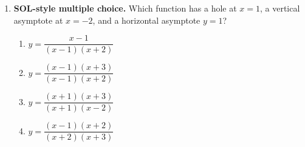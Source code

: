 \documentclass[10pt]{article}
\begin{document}
\begin{enumerate}[leftmargin=1.8em, itemsep=8pt]
  \item \textbf{SOL-style multiple choice.} Which function has a hole at $x=1$, a vertical asymptote at
        $x=-2$, and a horizontal asymptote $y=1$?
        \begin{enumerate}[label=\Alph*., leftmargin=1.9em, itemsep=1pt]
          \item $y=\dfrac{x-1}{(x-1)(x+2)}$
          \item $y=\dfrac{(x-1)(x+3)}{(x-1)(x+2)}$
          \item $y=\dfrac{(x+1)(x+3)}{(x+1)(x-2)}$
          \item $y=\dfrac{(x-1)(x+2)}{(x+2)(x+3)}$
        \end{enumerate}
\end{enumerate}
\end{document}
